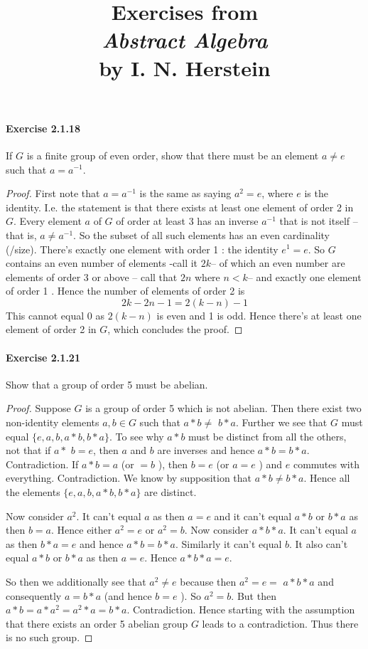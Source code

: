 \documentclass{article}
\title{\textbf{
Exercises from \\
\textit{Abstract Algebra} \\
by I. N. Herstein
}}
\date{}
\begin{document}
\maketitle


\paragraph{Exercise 2.1.18} If $G$ is a finite group of even order, show that there must be an element $a \neq e$ such that $a=a^{-1}$.
\begin{proof}
    First note that $a=a^{-1}$ is the same as saying $a^2=e$, where $e$ is the identity. I.e. the statement is that there exists at least one element of order 2 in $G$.
Every element $a$ of $G$ of order at least 3 has an inverse $a^{-1}$ that is not itself -- that is, $a \neq a^{-1}$. So the subset of all such elements has an even cardinality (/size). There's exactly one element with order 1 : the identity $e^1=e$. So $G$ contains an even number of elements -call it $2 k$-- of which an even number are elements of order 3 or above -- call that $2 n$ where $n<k$-- and exactly one element of order 1 . Hence the number of elements of order 2 is
$$
2 k-2 n-1=2(k-n)-1
$$
This cannot equal 0 as $2(k-n)$ is even and 1 is odd. Hence there's at least one element of order 2 in $G$, which concludes the proof.
\end{proof}



\paragraph{Exercise 2.1.21} Show that a group of order 5 must be abelian.
\begin{proof}
    Suppose $G$ is a group of order 5 which is not abelian. Then there exist two non-identity elements $a, b \in G$ such that $a * b \neq$ $b * a$. Further we see that $G$ must equal $\{e, a, b, a * b, b * a\}$. To see why $a * b$ must be distinct from all the others, not that if $a *$ $b=e$, then $a$ and $b$ are inverses and hence $a * b=b * a$.
Contradiction. If $a * b=a$ (or $=b$ ), then $b=e$ (or $a=e$ ) and $e$ commutes with everything. Contradiction. We know by supposition that $a * b \neq b * a$. Hence all the elements $\{e, a, b, a * b, b * a\}$ are distinct.

Now consider $a^2$. It can't equal $a$ as then $a=e$ and it can't equal $a * b$ or $b * a$ as then $b=a$. Hence either $a^2=e$ or $a^2=b$.
Now consider $a * b * a$. It can't equal $a$ as then $b * a=e$ and hence $a * b=b * a$. Similarly it can't equal $b$. It also can't equal $a * b$ or $b * a$ as then $a=e$. Hence $a * b * a=e$.

So then we additionally see that $a^2 \neq e$ because then $a^2=e=$ $a * b * a$ and consequently $a=b * a$ (and hence $b=e$ ). So $a^2=b$. But then $a * b=a * a^2=a^2 * a=b * a$. Contradiction.
Hence starting with the assumption that there exists an order 5 abelian group $G$ leads to a contradiction. Thus there is no such group.
\end{proof}
\end{document}
